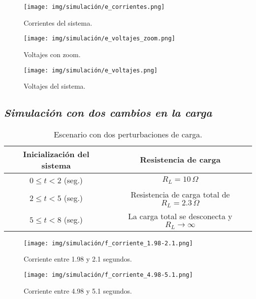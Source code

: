 \begin{figure}[H]
    \centering
    \texttt{[image: img/simulación/e\_corrientes.png]}
    \caption{Corrientes del sistema.}
    \label{fig:e_corrientes}
\end{figure}

\begin{figure}[H]
    \centering
    \texttt{[image: img/simulación/e\_voltajes\_zoom.png]}
    \caption{Voltajes con zoom.}
    \label{fig:e_voltajes_zoom}
\end{figure}

\begin{figure}[H]
    \centering
    \texttt{[image: img/simulación/e\_voltajes.png]}
    \caption{Voltajes del sistema.}
    \label{fig:e_voltajes}
\end{figure}

\subsection{\textit{Simulación con dos cambios en la carga}}

\begin{table}[H]
    \centering
    \begin{tabular}{|c|c|}
    \hline
    \textbf{Inicialización del sistema} & \textbf{Resistencia de carga} \\
    \hline
    $0 \leq t < 2$ (seg.) & $R_L = 10\,\Omega$ \\
    \hline
    $2 \leq t < 5$ (seg.) & Resistencia de carga total de $R_L = 2.3\,\Omega$ \\
    \hline
    $5 \leq t < 8$ (seg.) & La carga total se desconecta y $R_L \rightarrow \infty$ \\
    \hline
\end{tabular}
\caption{Escenario con dos perturbaciones de carga.}
\label{tab:f}
\end{table}


\begin{figure}[H]
    \centering
    \texttt{[image: img/simulación/f\_corriente\_1.98-2.1.png]}
    \caption{Corriente entre 1.98 y 2.1 segundos.}
    \label{fig:f_corriente_1.98-2.1}
\end{figure}

\begin{figure}[H]
    \centering
    \texttt{[image: img/simulación/f\_corriente\_4.98-5.1.png]}
    \caption{Corriente entre 4.98 y 5.1 segundos.}
\label{fig:f_corriente_4.98-5.1}
\end{figure}

